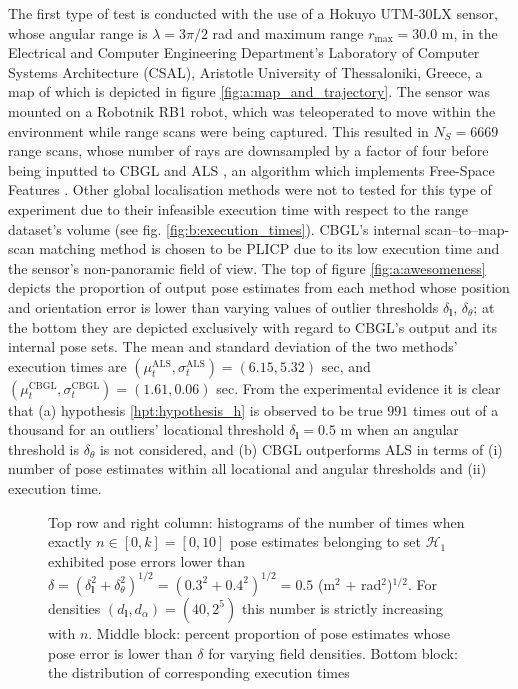 The first type of test is conducted with the use of a Hokuyo UTM-30LX
sensor, whose angular range is $\lambda = 3\pi/2$ rad and maximum range
$r_{\max} = 30.0$ m, in the  Electrical and Computer Engineering Department's
Laboratory of Computer Systems Architecture (CSAL), Aristotle University of
Thessaloniki, Greece, a map of which is depicted in figure
\ref{fig:a:map_and_trajectory}. The sensor was mounted on a Robotnik RB1 robot,
which was teleoperated to move within the environment while range scans were
being captured. This resulted in $N_{S}=6669$ range scans, whose number of rays
are downsampled by a factor of four before being inputted to CBGL and ALS
\cite{als_jp}, an algorithm which implements Free-Space Features
\cite{als_eth}. Other global localisation methods were not to tested for this
type of experiment due to their infeasible execution time with respect to the
range dataset's volume (see fig. \ref{fig:b:execution_times}).  CBGL's internal
scan--to--map-scan matching method is chosen to be PLICP \cite{Censi2008c} due
to its low execution time and the sensor's non-panoramic field of view.  The top
of figure \ref{fig:a:awesomeness} depicts the proportion of output pose
estimates from each method whose position and orientation error is lower than
varying values of outlier thresholds $\delta_{\bm{l}}$, $\delta_{\theta}$; at
the bottom they are depicted exclusively with regard to CBGL's output and its
internal pose sets. The mean and standard deviation of the two methods'
execution times are $(\mu_t^{\text{ALS}}, \sigma_t^{\text{ALS}}) = (6.15,
5.32)$ sec, and $(\mu_t^{\text{CBGL}}, \sigma_t^{\text{CBGL}}) = (1.61, 0.06)$
sec. From the experimental evidence it is clear that (a) hypothesis
\ref{hpt:hypothesis_h} is observed to be true $991$ times out of a thousand for
an outliers' locational threshold $\delta_{\bm{l}} = 0.5$ m when an angular
threshold is $\delta_{\theta}$ is not considered, and (b) CBGL outperforms ALS
in terms of (i) number of pose estimates within all locational and angular
thresholds and (ii) execution time.

\begin{figure}
  \vspace{-0.3cm}
  
  \vspace{-0.3cm}
  \caption{\small Top row and right column: histograms of the number of times
           when exactly $n \in [0,k] = [0,10]$ pose estimates belonging to set
           $\mathcal{H}_1$ exhibited pose errors lower than $\delta =
           (\delta_{\bm{l}}^2 + \delta_{\theta}^2)^{1/2} =  (0.3^2 +
           0.4^2)^{1/2} = 0.5$ (m$^2$ + rad$^2$)$^{1/2}$. For densities
           $(d_{\bm{l}},d_{\alpha}) = (40, 2^5)$ this number is strictly
           increasing with $n$. Middle block: percent proportion of pose
           estimates whose pose error is lower than $\delta$ for varying field
           densities. Bottom block: the distribution of corresponding execution
           times}
  \label{fig:a:determine_40_32}
\end{figure}


